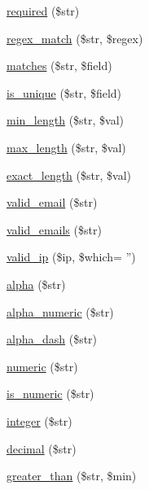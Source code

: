 \begin{DoxyCompactItemize}
\hyperlink{class_c_i___form__validation_ada72eadfd041118d5f429a93dd0de07e}{required} (\$str)
\item 
\hyperlink{class_c_i___form__validation_acef19e29276dbdd2c69dffd5ec635600}{regex\-\_\-match} (\$str, \$regex)
\item 
\hyperlink{class_c_i___form__validation_aefdd25116835b684a2ab9ce6ef58d38c}{matches} (\$str, \$field)
\item 
\hyperlink{class_c_i___form__validation_a1a5ee6b60f419248ca8796444aea3a78}{is\-\_\-unique} (\$str, \$field)
\item 
\hyperlink{class_c_i___form__validation_a63a166f35fed88ec433fd2a37ec5ae90}{min\-\_\-length} (\$str, \$val)
\item 
\hyperlink{class_c_i___form__validation_a0896e538dd761148e6b3dfb0e033d344}{max\-\_\-length} (\$str, \$val)
\item 
\hyperlink{class_c_i___form__validation_a126edde2bb0ce82d7a202e340a61de9e}{exact\-\_\-length} (\$str, \$val)
\item 
\hyperlink{class_c_i___form__validation_af7d43edae9c6e388390176b3c62de140}{valid\-\_\-email} (\$str)
\item 
\hyperlink{class_c_i___form__validation_a7692019b59978c17621e3920823621c4}{valid\-\_\-emails} (\$str)
\item 
\hyperlink{class_c_i___form__validation_a2adf8f23c98fcdafdc7588f874db4c4d}{valid\-\_\-ip} (\$ip, \$which= '')
\item 
\hyperlink{class_c_i___form__validation_a4784b18b432005bec36cdf437353ec76}{alpha} (\$str)
\item 
\hyperlink{class_c_i___form__validation_aa3b561d437be2774b1a6850ada97024a}{alpha\-\_\-numeric} (\$str)
\item 
\hyperlink{class_c_i___form__validation_a4d1ca92bb78369923e57b2f6aca58c70}{alpha\-\_\-dash} (\$str)
\item 
\hyperlink{class_c_i___form__validation_a058a2b065a28a929956630238d5bf5bb}{numeric} (\$str)
\item 
\hyperlink{class_c_i___form__validation_af3c765884a08debf97c40b4ef9ffd8c0}{is\-\_\-numeric} (\$str)
\item 
\hyperlink{class_c_i___form__validation_af1c6586c2e80ccbb28b09803c3b5461c}{integer} (\$str)
\item 
\hyperlink{class_c_i___form__validation_af460b7c2f8d785b7472329446c600f31}{decimal} (\$str)
\item 
\hyperlink{class_c_i___form__validation_a8dd73c5e1d6880a650bb41e1ec6ee2f4}{greater\-\_\-than} (\$str, \$min)

\end{DoxyCompactItemize}
